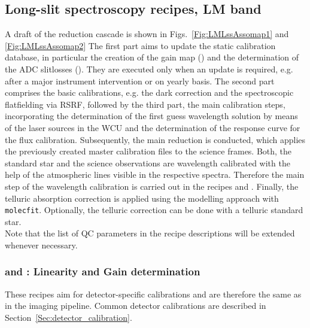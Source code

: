 \clearpage
\subsection{Long-slit spectroscopy recipes, LM band}
\label{ssec:recipes_lss_lm}

A draft of the reduction cascade is shown in
Figs.~\ref{Fig:LMLssAssomap1} and \ref{Fig:LMLssAssomap2}%
The first part aims to update the static calibration database, in particular the creation of the gain map (\hyperref[Sec:detector_calibration]{}) and the determination of the \ac{ADC} slitlosses (\hyperref[rec:metis_lm_adc_slitloss]{}). They are executed only when an update is required, e.g. after a major instrument intervention or on yearly basis. The second part comprises the basic calibrations, e.g. the dark correction and the spectroscopic flatfielding via \ac{RSRF}, followed by the third part, the main calibration steps, incorporating the determination of the first guess wavelength solution by means of the laser sources in the \ac{WCU} and the determination of the response curve for the flux calibration. Subsequently, the main reduction is conducted, which applies the previously created master calibration files to the science frames. Both, the standard star and the science observations are wavelength calibrated with the help of the atmospheric lines visible in the respective spectra. Therefore the main step of the wavelength calibration is carried out in the recipes \hyperref[rec:metis_lm_lss_std]{} and \hyperref[rec:metis_lm_lss_sci]{}. Finally, the telluric absorption correction is applied using the modelling approach with \texttt{molecfit}. Optionally, the telluric correction can be done with a telluric standard star.\\
Note that the list of \ac{QC} parameters in the recipe descriptions will be extended whenever necessary.\\

\subsubsection{ and : Linearity and Gain determination}
These recipes aim for detector-specific calibrations and are therefore the same as in the imaging pipeline. Common detector calibrations are described in Section~\ref{Sec:detector_calibration}.

